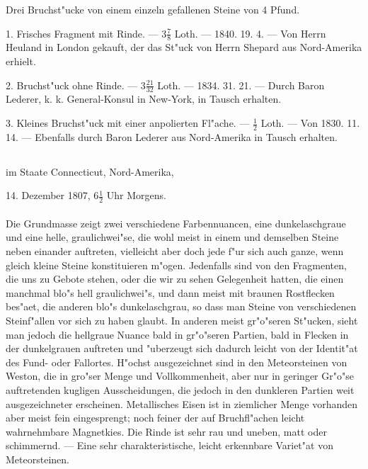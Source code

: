 \documentclass[a4paper, 11pt, oneside, polutonikogreek, german]{article}
\begin{document}
Drei Bruchst"ucke von einem einzeln gefallenen Steine von 4 Pfund.

1. Frisches Fragment mit Rinde. --- $\mathfrak{3\frac{7}{8}}$ Loth. --- 1840. 19. 4. --- Von Herrn Heuland in London gekauft, der das St"uck von Herrn Shepard aus Nord-Amerika erhielt.

2. Bruchst"uck ohne Rinde. --- $\mathfrak{3\frac{21}{32}}$ Loth. --- 1834. 31. 21. --- Durch Baron Lederer, k. k. General-Konsul in New-York, in Tausch erhalten.

3. Kleines Bruchst"uck mit einer anpolierten Fl"ache. --- $\mathfrak{\frac{1}{2}}$ Loth. --- Von 1830. 11. 14. --- Ebenfalls durch Baron Lederer aus Nord-Amerika in Tausch erhalten.
\subsection[\swabfamily {Weston.}]{}
\begin{center}

im Staate Connecticut, Nord-Amerika,

14. Dezember 1807, $\mathfrak{6\frac{1}{2}}$ Uhr Morgens.
\end{center}
\paragraph{}
Die Grundmasse zeigt zwei verschiedene Farbennuancen, eine dunkelaschgraue und eine helle, graulichwei"se, die wohl meist in einem und demselben Steine neben einander auftreten, vielleicht aber doch jede f"ur sich auch ganze, wenn gleich kleine Steine konstituieren m"ogen. Jedenfalls sind von den Fragmenten, die uns zu Gebote stehen, oder die wir zu sehen Gelegenheit hatten, die einen manchmal blo"s hell graulichwei"s, und dann meist mit braunen Rostflecken bes"aet, die anderen blo"s dunkelaschgrau, so dass man Steine von verschiedenen Steinf"allen vor sich zu haben glaubt. In anderen meist gr"o"seren St"ucken, sieht man jedoch die hellgraue Nuance bald in gr"o"seren Partien, bald in Flecken in der dunkelgrauen auftreten und "uberzeugt sich dadurch leicht von der Identit"at des Fund- oder Fallortes. H"ochst ausgezeichnet sind in den Meteorsteinen von Weston, die in gro"ser Menge und Vollkommenheit, aber nur in geringer Gr"o"se auftretenden kugligen Ausscheidungen, die jedoch in den dunkleren Partien weit ausgezeichneter erscheinen. Metallisches Eisen ist in ziemlicher Menge vorhanden aber meist fein eingesprengt; noch feiner der auf Bruchfl"achen leicht wahrnehmbare Magnetkies. Die Rinde ist sehr rau und uneben, matt oder schimmernd. --- Eine sehr charakteristische, leicht erkennbare Variet"at von Meteorsteinen.
\end{document}
